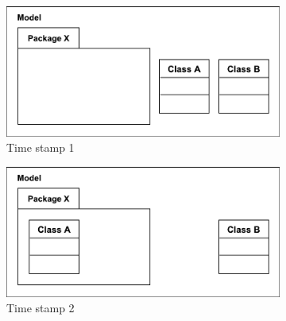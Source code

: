 \begin{figure}[ht]
    \begin{subfigure}[t]{0.329\linewidth}
        \centering
        \includegraphics[width=\linewidth]{images/illustration_3}
        \caption{Time stamp 1}
        \label{fig:illustration_3}
    \end{subfigure}
    \begin{subfigure}[t]{0.329\linewidth}
        \centering
        \includegraphics[width=\linewidth]{images/illustration_4}
        \caption{Time stamp 2}
        \label{fig:illustration_4}
    \end{subfigure}
    \begin{subfigure}[t]{0.329\linewidth}
        \centering

\end{subfigure}
\end{figure}
